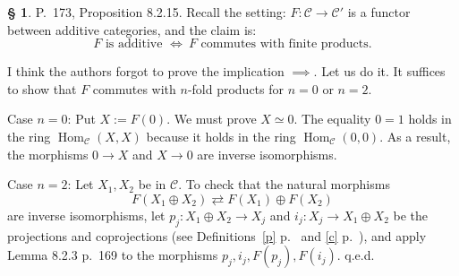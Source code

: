 \documentclass[12pt]{article}
\theoremstyle{remark}
\theoremstyle{definition}
\newtheorem{s}[thm]{\S}
\newcommand{\C}{\mathcal C}
\DeclareMathOperator{\Hom}{Hom}%
\begin{document}
%
\begin{s} 
P.~173, Proposition 8.2.15. Recall the setting: $F:\C\to\C'$ is a functor between additive categories, and the claim is: 
$$
F\text{ is additive }\iff\ F\text{ commutes with finite products}.
$$ 

I think the authors forgot to prove the implication $\implies$. Let us do it. It suffices to show that $F$ commutes with $n$-fold products for $n=0$ or $n=2$. 

Case $n=0$: Put $X:=F(0)$. We must prove $X\simeq 0$. The equality $0=1$ holds in the ring $\Hom_\C(X,X)$ because it holds in the ring $\Hom_\C(0,0)$. As a result, the morphisms $0\to X$ and $X\to 0$ are inverse isomorphisms. 

Case $n=2$: Let $X_1,X_2$ be in $\C$. To check that the natural morphisms 
%
\begin{equation}\label{173} 
F(X_1\oplus X_2)\rightleftarrows F(X_1)\oplus F(X_2)
\end{equation} 
%
are inverse isomorphisms, let $p_j:X_1\oplus X_2\to X_j$ and $i_j:X_j\to X_1\oplus X_2$ be the projections and coprojections (see Definitions~\ref{p} p.~\pageref{p} and \ref{c} p.~\pageref{c}), and apply Lemma 8.2.3 p.~169 to the morphisms $p_j,i_j,F(p_j),F(i_j)$. q.e.d.
\end{s}
%
%
\end{document}
